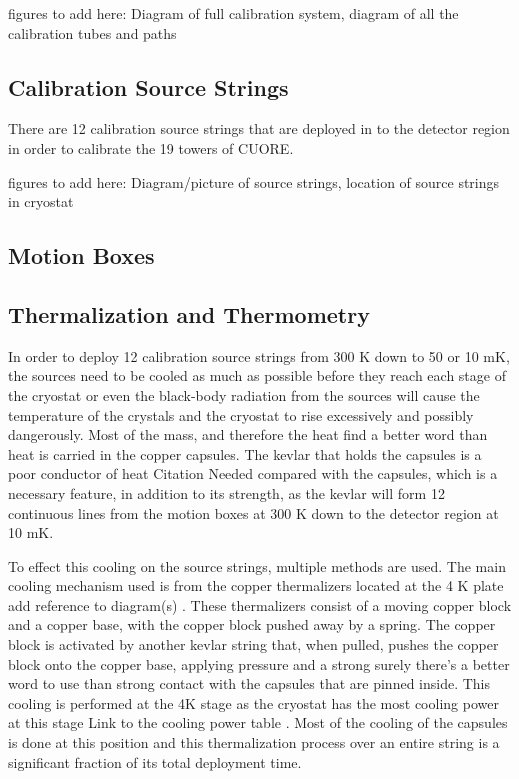 figures to add here: Diagram of full calibration system, diagram of all the calibration tubes and paths

\subsection{Calibration Source Strings}
There are 12 calibration source strings that are deployed in to the detector region in order to calibrate the 19 towers of CUORE.

figures to add here: Diagram/picture of source strings, location of source strings in cryostat
\subsection{Motion Boxes}

\subsection{Thermalization and Thermometry}
In order to deploy 12 calibration source strings from 300 K down to 50 or 10 mK, the sources need to be cooled as much as possible before they reach each stage of the cryostat or even the black-body radiation from the sources will cause the temperature of the crystals and the cryostat to rise excessively and possibly dangerously. Most of the mass, and therefore the heat \color{red} find a better word than heat \color{black} is carried in the copper capsules. The kevlar that holds the capsules is a poor conductor of heat \color{red} Citation Needed \color{black} compared with the capsules, which is a necessary feature, in addition to its strength, as the kevlar will form 12 continuous lines from the motion boxes at 300 K down to the detector region at 10 mK.

To effect this cooling on the source strings, multiple methods are used. The main cooling mechanism used is from the copper thermalizers located at the 4 K plate \color{red} add reference to diagram(s) \color{black}. These thermalizers consist of a moving copper block and a copper base, with the copper block pushed away by a spring. The copper block is activated by another kevlar string that, when pulled, pushes the copper block onto the copper base, applying pressure and a strong \color{red} surely there's a better word to use than strong \color{black} contact with the capsules that are pinned inside. This cooling is performed at the 4K stage as the cryostat has the most cooling power at this stage \color{red} Link to the cooling power table \color{black}. Most of the cooling of the capsules is done at this position and this thermalization process over an entire string is a significant fraction of its total deployment time.

